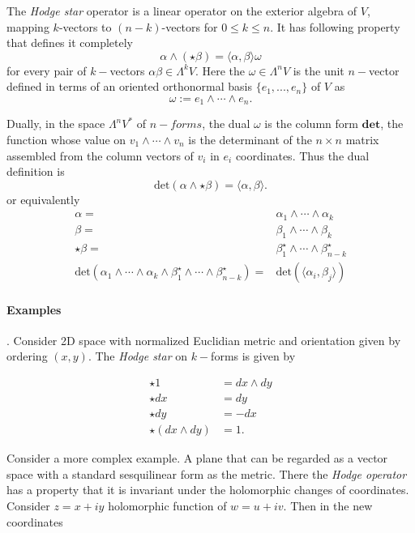 The \textit{Hodge star} operator is a linear operator on the exterior algebra of $V$, mapping $k$-vectors to $(n-k)$-vectors for $0\leq k \leq n$. It has following property that defines it completely
\begin{equation}
\alpha\wedge(\star\beta) = \langle\alpha,\beta\rangle\omega 
\end{equation}
for every pair of $k-$vectors $\alpha\beta\in\Lambda^kV$.
Here the $\omega\in\Lambda^nV$ is the unit $n-$vector defined in terms of an oriented orthonormal basis $\{e_1,...,e_n\}$ of $V$ as
\begin{equation}
\omega := e_1 \wedge \cdots \wedge e_n.
\end{equation}

Dually, in the space $\Lambda^n V^*$ of $n-forms$, the dual $\omega$ is the column form $\textbf{det}$, the function whose value on $v_1\wedge\cdots\wedge v_n$ is the determinant of the $n\times n$ matrix assembled from the column vectors of $v_i$ in $e_i$ coordinates. Thus the dual definition is 
\begin{equation}
\text{det}(\alpha\wedge\star\beta) = \langle\alpha,\beta\rangle.
\end{equation}
or equivalently 
\begin{align}
\alpha =& \alpha_1\wedge\cdots\wedge\alpha_k \\
\beta =& \beta_1\wedge\cdots\wedge\beta_k \\
\star\beta =& \beta_1 ^{\star} \wedge\cdots\wedge \beta_{n-k} ^ {\star} \\
\text{det}(\alpha_1\wedge\cdots\wedge\alpha_k\wedge\beta_1 ^{\star}\wedge\cdots\wedge\beta_{n-k}^{\star}) =& \text{det}(\langle\alpha_i,\beta_j\rangle)
\end{align}

\paragraph{Examples}.
Consider 2D space with normalized Euclidian metric and orientation given by ordering $(x,y)$. The \textit{Hodge star} on $k-$forms is given by 

\begin{align}
\star 1 &= dx \wedge dy \\
\star dx &= dy \\
\star dy &= -dx \\
\star(dx \wedge dy) &= 1.
\end{align}

Consider a more complex example. A plane that can be regarded as a vector space with a standard sesquilinear form as the metric. 
There the \textit{Hodge operator} has a property that it is invariant under the holomorphic changes of coordinates. 
Consider $z = x + iy$ holomorphic function of $w=u + iv$. Then in the new coordinates 

